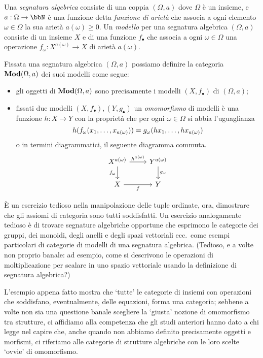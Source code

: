 \begin{example}\label{ex_cat_sigma_strutture}
	Una \emph{segnatura algebrica} consiste di una coppia \((\Omega, a)\) dove \(\Omega\) è un insieme, e \(a : \Omega \to \bbN\) è una funzione detta \emph{funzione di arietà} che associa a ogni elemento \(\omega \in \Omega\) la sua arietà \(a(\omega)\ge 0\). Un \emph{modello} per una segnatura algebrica \((\Omega,a)\) consiste di un insieme \(X\) e di una funzione \(f_\bullet\) che associa a ogni \(\omega\in\Omega\) una operazione \(f_\omega : X^{a(\omega)} \to X\) di arietà \(a(\omega)\).

	Fissata una segnatura algebrica \((\Omega,a)\) possiamo definire la categoria \(\mathbf{Mod}(\Omega,a)\) dei suoi modelli come segue:
	\begin{itemize}
		\item gli oggetti di \(\mathbf{Mod}(\Omega,a)\) sono precisamente i modelli \((X,f_\bullet)\) di \((\Omega,a)\);
		\item fissati due modelli \((X,f_\bullet), (Y,g_\bullet)\) un \emph{omomorfismo} di modelli è una funzione \(h : X\to Y\) con la proprietà che per ogni \(\omega\in\Omega\) si abbia l'uguaglianza
		      \[h(f_\omega(\tup x{a(\omega)},)) = g_\omega(\tup {hx}{a(\omega)},)\]
		      o in termini diagrammatici, il seguente diagramma commuta.
		      \[
			      \begin{tikzcd}
				      X^{a(\omega)} \ar{r}{h^{a(\omega)}} \ar[d, "f_\omega"'] & Y^{a(\omega)} \ar{d}{g_\omega} \\
				      X \ar[r, "f"']& Y
			      \end{tikzcd}
		      \]
	\end{itemize}
\end{example}
\`E un esercizio tedioso nella manipolazione delle tuple ordinate, ora, dimostrare che gli assiomi di categoria sono tutti soddisfatti. Un esercizio analogamente tedioso è di trovare segnature algebriche opportune che esprimono le categorie dei gruppi, dei monoidi, degli anelli e degli spazi vettoriali ecc.\ come esempi particolari di categorie di modelli di una segnatura algebrica. (Tedioso, e a volte non proprio banale: ad esempio, come si descrivono le operazioni di moltiplicazione per scalare in uno spazio vettoriale usando la definizione di segnatura algebrica?)
\begin{notation}
	L'esempio appena fatto mostra che `tutte' le categorie di insiemi con operazioni che soddisfano, eventualmente, delle equazioni, forma una categoria; sebbene a volte non sia una questione banale scegliere la `giusta' nozione di omomorfismo tra strutture, ci affidiamo alla competenza che gli studi anteriori hanno dato a chi legge nel capire che, anche quando non abbiamo definito precisamente oggetti e morfismi, ci riferiamo alle categorie di strutture algebriche con le loro scelte `ovvie' di omomorfismo.
\end{notation}
